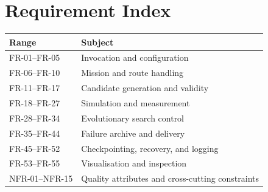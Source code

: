 \documentclass[11pt,a4paper]{report}
\begin{document}
\appendix
\chapter{Requirement Index}
\small
\begin{longtable}{L{2cm} L{12.7cm}}
\toprule
\textbf{Range} & \textbf{Subject}\\
\midrule
FR-01--FR-05 & Invocation and configuration\\
FR-06--FR-10 & Mission and route handling\\
FR-11--FR-17 & Candidate generation and validity\\
FR-18--FR-27 & Simulation and measurement\\
FR-28--FR-34 & Evolutionary search control\\
FR-35--FR-44 & Failure archive and delivery\\
FR-45--FR-52 & Checkpointing, recovery, and logging\\
FR-53--FR-55 & Visualisation and inspection\\
NFR-01--NFR-15 & Quality attributes and cross-cutting constraints\\
\bottomrule
\end{longtable}
\end{document}
